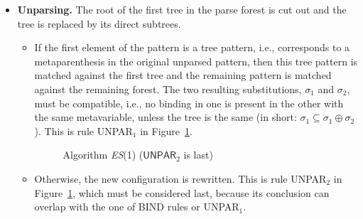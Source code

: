 \begin{itemize}
  \item \textbf{Unparsing.} The root of the first tree in the parse
  forest is cut out and the tree is replaced by its direct
  subtrees.
    \begin{itemize}

      \item If the first element of the pattern is a tree pattern,
      i.e., corresponds to a meta\-parenthesis in the original
      unparsed pattern, then this tree pattern is matched against the
      first tree and the remaining pattern is matched against the
      remaining forest. The two resulting substitutions, \(\sigma_1\)
      and \(\sigma_2\), must be compatible, i.e., no binding in one is
      present in the other with the same meta\-variable, unless the
      tree is the same (in short: \(\sigma_1 \subseteq \sigma_1 \oplus
      \sigma_2\)). This is rule \textsf{UNPAR}\(_1\) in
      Figure~\ref{es1_match_def}.

\begin{figure}[t]
\caption{Algorithm \textit{ES}(1)
(\(\textsf{UNPAR}_2\) is last)
\label{es1_match_def}}
\end{figure}

      \item Otherwise, the new configuration is rewritten. This is
      rule \textsf{UNPAR}\(_2\) in Figure~\ref{es1_match_def}, which
      must be considered last, because its conclusion can overlap with
      the one of \textsf{BIND} rules or \textsf{UNPAR}\(_1\).

    \end{itemize}

\end{itemize}

